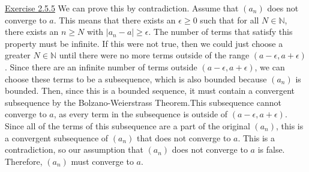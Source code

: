 \documentclass{exam}
\begin{document}

\underline{Exercise 2.5.5}
\newline
\newline
We can prove this by contradiction. Assume that $(a_n)$ does not converge to $a$. This means that there exists an $\epsilon\ge0$ such that for all $N\in\mathbb{N}$, there exists an $n\ge N$ with $|a_n-a|\ge\epsilon$. The number of terms that satisfy this property must be infinite. If this were not true, then we could just choose a greater $N\in\mathbb{N}$ until there were no more terms outside of the range $(a-\epsilon, a+\epsilon)$. Since there are an infinite number of terms outside $(a-\epsilon, a+\epsilon)$, we can choose these terms to be a subsequence, which is also bounded because $(a_n)$ is bounded. Then, since this is a bounded sequence, it must contain a convergent subsequence by the Bolzano-Weierstrass Theorem.This subsequence cannot converge to $a$, as every term in the subsequence is outside of $(a-\epsilon, a+\epsilon)$. Since all of the terms of this subsequence are a part of the original $(a_n)$, this is a convergent subsequence of $(a_n)$ that does not converge to $a$. This is a contradiction, so our assumption that $(a_n)$ does not converge to $a$ is false. Therefore, $(a_n)$ must converge to $a$.
\newline
\end{document}
